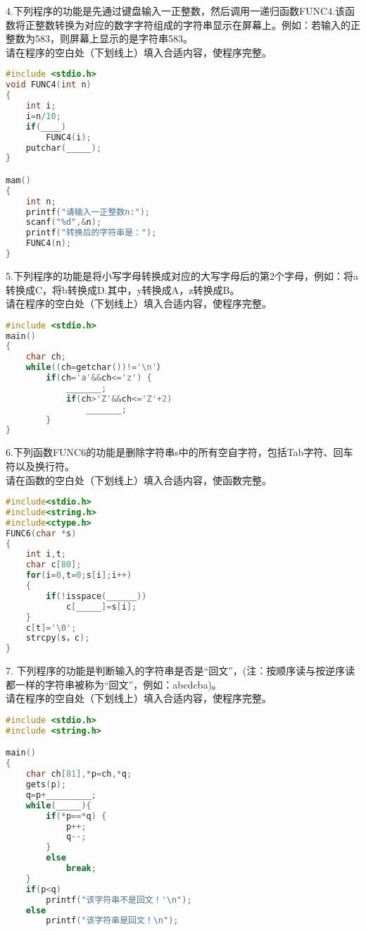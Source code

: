 4.下列程序的功能是先通过键盘输入一正整数，然后调用一递归函数FUNC4.该函数将正整数转换为对应的数字字符组成的字符串显示在屏幕上。例如：若输入的正整数为583，则屏幕上显示的是字符串583。 \\
请在程序的空白处（下划线上）填入合适内容，使程序完整。
\begin{lstlisting}[language=cpp]
#include <stdio.h>
void FUNC4(int n)
{
    int i;
    i=n/10;
    if(____)
        FUNC4(i);
    putchar(_____);
}

mam()
{
    int n;
    printf("请输入一正整数n:");
    scanf("%d",&n);
    printf("转换后的字符串是：");
    FUNC4(n);
}
\end{lstlisting}

5.下列程序的功能是将小写字母转换成对应的大写字母后的第2个字母，例如：将a转换成C，将b转换成D.其中，y转换成A，z转换成B。 \\
请在程序的空白处（下划线上）填入合适内容，使程序完整。
\begin{lstlisting}[language=cpp]
#include <stdio.h>
main()
{
    char ch;
    while((ch=getchar())!='\n'）
        if(ch='a'&&ch<='z') {
            _______;
            if(ch>'Z'&&ch<='Z'+2)
                _______;
        }
}
\end{lstlisting}
    
6.下列函数FUNC6的功能是删除字符串s中的所有空自字符，包括Tab字符、回车符以及换行符。 \\
请在函数的空白处（下划线上）填入合适内容，使函数完整。
\begin{lstlisting}[language=cpp]
#include<stdio.h>
#include<string.h>
#include<ctype.h>
FUNC6(char *s)
{
    int i,t;
    char c[80];
    for(i=0,t=0;s[i];i++)
    {
        if(!isspace(______))
            c[_____]=s[i];
    }
    c[t]='\0';
    strcpy(s，c);
}
\end{lstlisting}

7. 下列程序的功能是判断输入的字符串是否是“回文”，(注：按顺序读与按逆序读都一样的字符串被称为“回文”，例如：abcdcba)。 \\
请在程序的空自处（下划线上）填入合适内容，使程序完整。
\begin{lstlisting}[language=cpp]
#include <stdio.h>
#include <string.h>

main()
{
    char ch[81],*p=ch,*q;
    gets(p);
    q=p+_________;
    while(_____){
        if(*p==*q) {
            p++;
            q--;
        }
        else
            break;
    }
    if(p<q)
        printf("该字符串不是回文！'\n");
    else
        printf("该字符串是回文！\n");
\end{lstlisting}

